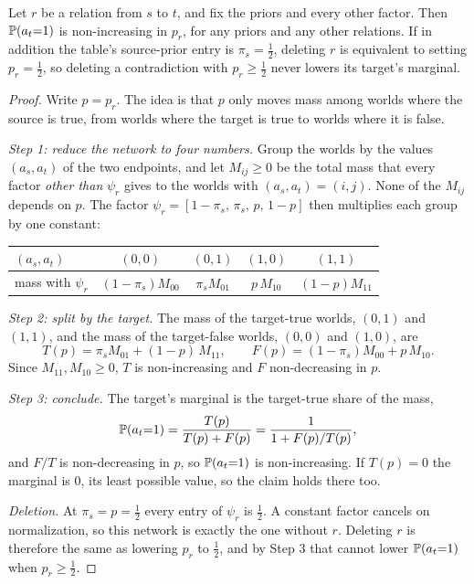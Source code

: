 \begin{proposition}
\label{prop-local}
Let $r$ be a \con{} relation from $s$ to $t$, and fix the priors and every other factor. Then
$\mathbb{P}\!\left( a_t{=}1 \right)$ is non-increasing in $p_r$, for any priors and any other relations. If in addition
the table's source-prior entry is $\pi_s=\tfrac12$, deleting $r$ is equivalent to setting
$p_r=\tfrac12$, so deleting a contradiction with $p_r\ge\tfrac12$ never lowers its target's
marginal.
\end{proposition}
\begin{proof}
Write $p=p_r$. The idea is that $p$ only moves mass among worlds where the source is true,
from worlds where the target is true to worlds where it is false.

\emph{Step 1: reduce the network to four numbers.} Group the worlds by the values $(a_s,a_t)$ of the
two endpoints, and let $M_{ij}\ge0$ be the total mass that every factor \emph{other than} $\psi_r$
gives to the worlds with $(a_s,a_t)=(i,j)$. None of the $M_{ij}$ depends on $p$. The factor
$\psi_r=[1-\pi_s,\,\pi_s,\,p,\,1-p]$ then multiplies each group by one constant:
\begin{center}\small
\begin{tabular}{@{}lcccc@{}}
\toprule
$(a_s,a_t)$ & $(0,0)$ & $(0,1)$ & $(1,0)$ & $(1,1)$ \\
\midrule
mass with $\psi_r$ & $(1-\pi_s)M_{00}$ & $\pi_s M_{01}$ & $p\,M_{10}$ & $(1-p)M_{11}$ \\
\bottomrule
\end{tabular}
\end{center}

\emph{Step 2: split by the target.} The mass of the target-true worlds, $(0,1)$ and $(1,1)$, and the
mass of the target-false worlds, $(0,0)$ and $(1,0)$, are
\[
T(p)=\pi_s M_{01}+(1-p)\,M_{11},
\qquad
F(p)=(1-\pi_s)M_{00}+p\,M_{10} .
\]
Since $M_{11},M_{10}\ge0$, $T$ is non-increasing and $F$ non-decreasing in $p$.

\emph{Step 3: conclude.} The target's marginal is the target-true share of the mass,
\[
\mathbb{P}\!\left( a_t{=}1 \right)=\frac{T(p)}{T(p)+F(p)}=\frac{1}{1+F(p)/T(p)} ,
\]
and $F/T$ is non-decreasing in $p$, so $\mathbb{P}\!\left( a_t{=}1 \right)$ is non-increasing. If $T(p)=0$ the marginal is
$0$, its least possible value, so the claim holds there too.

\emph{Deletion.} At $\pi_s=p=\tfrac12$ every entry of $\psi_r$ is $\tfrac12$. A constant factor
cancels on normalization, so this network is exactly the one without $r$. Deleting $r$ is therefore
the same as lowering $p_r$ to $\tfrac12$, and by Step 3 that cannot lower $\mathbb{P}\!\left( a_t{=}1 \right)$ when
$p_r\ge\tfrac12$.
\end{proof}

